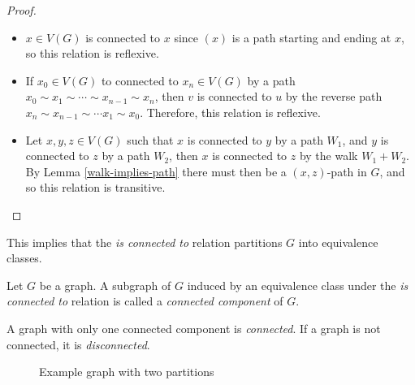 \begin{proof}\proofbreak
    \begin{itemize}
        \item $x \in V(G)$ is connected to $x$ since $(x)$ is a path starting and ending at $x$, so this relation is reflexive.
        \item If $x_0 \in V(G)$ to connected to $x_n \in V(G)$ by a path $x_0 \sim x_1 \sim \cdots \sim x_{n-1} \sim x_n$, then $v$ is connected to $u$ by the reverse path $x_n \sim x_{n-1} \sim \cdots x_1 \sim x_0$. Therefore, this relation is reflexive.
        \item Let $x, y, z \in V(G)$ such that $x$ is connected to $y$ by a path $W_1$, and $y$ is connected to $z$ by a path $W_2$, then $x$ is connected to $z$ by the walk $W_1 + W_2$. By Lemma \ref{walk-implies-path} there must then be a $(x, z)$-path in $G$, and so this relation is transitive.
    \end{itemize}
\end{proof}

\begin{rmk}
    This implies that the \emph{is connected to} relation partitions $G$ into equivalence classes.
\end{rmk}

\begin{defn}
    Let $G$ be a graph. A subgraph of $G$ induced by an equivalence class under the \emph{is connected to} relation is called a \emph{connected component} of $G$.
\end{defn}

\begin{defn}
    A graph with only one connected component is \emph{connected}. If a graph is not connected, it is \emph{disconnected}.
\end{defn}

\begin{figure}[ht!]
    \centering
\caption{Example graph with two partitions}
\label{fig:partition-graph-example}
\end{figure}

